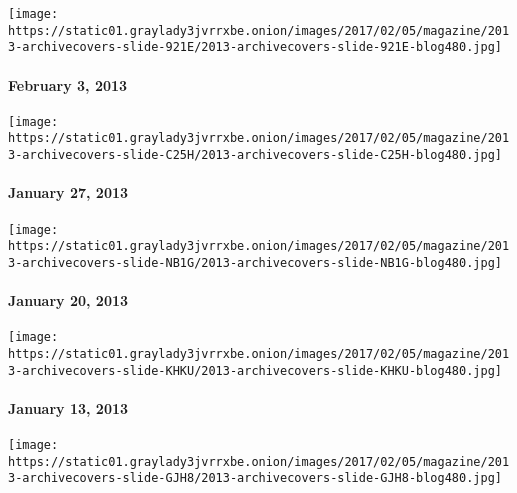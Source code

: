 \href{http://www.nytimes3xbfgragh.onion/indexes/2013/02/03/magazine/index.html}{}

\texttt{[image: https://static01.graylady3jvrrxbe.onion/images/2017/02/05/magazine/2013-archivecovers-slide-921E/2013-archivecovers-slide-921E-blog480.jpg]}

\hypertarget{february-3-2013}{%
\paragraph{February 3, 2013}\label{february-3-2013}}

\href{http://www.nytimes3xbfgragh.onion/indexes/2013/01/27/magazine/index.html}{}

\texttt{[image: https://static01.graylady3jvrrxbe.onion/images/2017/02/05/magazine/2013-archivecovers-slide-C25H/2013-archivecovers-slide-C25H-blog480.jpg]}

\hypertarget{january-27-2013}{%
\paragraph{January 27, 2013}\label{january-27-2013}}

\href{http://www.nytimes3xbfgragh.onion/indexes/2013/01/20/magazine/index.html}{}

\texttt{[image: https://static01.graylady3jvrrxbe.onion/images/2017/02/05/magazine/2013-archivecovers-slide-NB1G/2013-archivecovers-slide-NB1G-blog480.jpg]}

\hypertarget{january-20-2013}{%
\paragraph{January 20, 2013}\label{january-20-2013}}

\href{http://www.nytimes3xbfgragh.onion/indexes/2013/01/13/magazine/index.html}{}

\texttt{[image: https://static01.graylady3jvrrxbe.onion/images/2017/02/05/magazine/2013-archivecovers-slide-KHKU/2013-archivecovers-slide-KHKU-blog480.jpg]}

\hypertarget{january-13-2013}{%
\paragraph{January 13, 2013}\label{january-13-2013}}

\href{http://www.nytimes3xbfgragh.onion/indexes/2013/01/06/magazine/index.html}{}

\texttt{[image: https://static01.graylady3jvrrxbe.onion/images/2017/02/05/magazine/2013-archivecovers-slide-GJH8/2013-archivecovers-slide-GJH8-blog480.jpg]}

